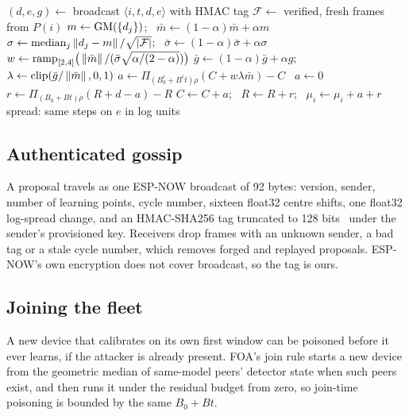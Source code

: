 \begin{algorithm}[t]
\caption{FOA step on device $i$ in cycle $t$}\label{alg:foa}
\begin{algorithmic}[1]
\State $(d,e,g)\gets$  
\State broadcast $\langle i,t,d,e\rangle$ with HMAC tag 
\State $\mathcal{F}\gets$ verified, fresh frames from $P(i)$
  \State $m\gets\operatorname{GM}(\{d_j\})$; \ $\bar m\gets(1-\alpha)\bar m+\alpha m$
  \State $\sigma\gets\mathrm{median}_j\left\lVert d_j-m \right\rVert/\sqrt{|\mathcal F|}$; \ $\bar\sigma\gets(1-\alpha)\bar\sigma+\alpha\sigma$
  \State $w\gets\mathrm{ramp}_{[2,4]}\big(\left\lVert \bar m \right\rVert/(\bar\sigma\sqrt{\alpha/(2-\alpha)})\big)$
  \State $\bar g\gets(1-\alpha)\bar g+\alpha g$; \ $\lambda\gets\mathrm{clip}(\bar g/\left\lVert \bar m \right\rVert,0,1)$ 
  \State $a\gets \Pi_{(B_0^c+B^c t)\rho}(C+w\lambda\bar m)-C$ 
\Else\ $a\gets 0$
\EndIf
\State $r\gets \Pi_{(B_0+Bt)\rho}(R+d-a)-R$ 
\State $C\gets C+a$; \ $R\gets R+r$; \ $\mu_i\gets\mu_i+a+r$
\State spread: same steps on $e$ in log units
\end{algorithmic}
\end{algorithm}

\subsection{Authenticated gossip}
A proposal travels as one ESP-NOW broadcast of 92 bytes: version, sender, number of learning points,
cycle number, sixteen float32 centre shifts, one float32 log-spread change, and an HMAC-SHA256 tag truncated
to 128 bits~\cite{hmac} under the sender's provisioned key. Receivers drop frames with an unknown sender,
a bad tag or a stale cycle number, which removes forged and replayed proposals. ESP-NOW's own encryption
does not cover broadcast, so the tag is ours.

\subsection{Joining the fleet}
A new device that calibrates on its own first window can be poisoned before it ever learns, if the
attacker is already present. FOA's join rule starts a new device from the geometric median of
same-model peers' detector state when such peers exist, and then runs it under the residual budget from
zero, so join-time poisoning is bounded by the same $B_0+Bt$.
